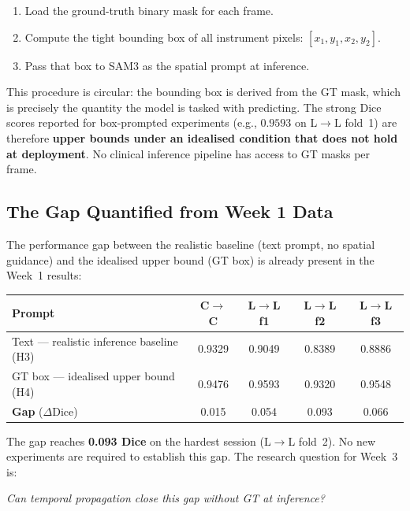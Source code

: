 \documentclass[11pt, a4paper]{article}
\begin{document}
\begin{enumerate}[noitemsep]
    \item Load the ground-truth binary mask for each frame.
    \item Compute the tight bounding box of all instrument pixels:
          $[x_1, y_1, x_2, y_2]$.
    \item Pass that box to SAM3 as the spatial prompt at inference.
\end{enumerate}

This procedure is circular: the bounding box is derived from the GT mask,
which is precisely the quantity the model is tasked with predicting.
The strong Dice scores reported for box-prompted experiments
(e.g., $0.9593$ on L$\to$L fold~1) are therefore \textbf{upper bounds under
an idealised condition that does not hold at deployment}.
No clinical inference pipeline has access to GT masks per frame.

\subsection{The Gap Quantified from Week 1 Data}

The performance gap between the realistic baseline (text prompt, no spatial
guidance) and the idealised upper bound (GT box) is already present in the
Week~1 results:

\begin{center}
\begin{tabular}{lcccc}
\toprule
\textbf{Prompt} & \textbf{C$\to$C} & \textbf{L$\to$L f1} &
    \textbf{L$\to$L f2} & \textbf{L$\to$L f3} \\
\midrule
Text --- realistic inference baseline (H3) & 0.9329 & 0.9049 & 0.8389 & 0.8886 \\
GT box --- idealised upper bound (H4)      & 0.9476 & 0.9593 & 0.9320 & 0.9548 \\
\midrule
\textbf{Gap} ($\Delta$Dice)                & 0.015  & 0.054  & 0.093  & 0.066  \\
\bottomrule
\end{tabular}
\end{center}

\noindent The gap reaches \textbf{0.093 Dice} on the hardest session (L$\to$L fold~2).
No new experiments are required to establish this gap.
The research question for Week~3 is:

\begin{center}
\textit{Can temporal propagation close this gap without GT at inference?}
\end{center}
\end{document}
